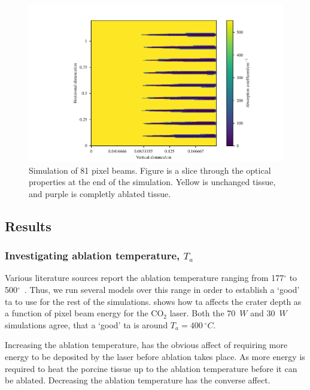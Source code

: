 \begin{figure}
	\centering
    \includegraphics[width=\columnwidth]{./ablation/images/slice.pdf}
    \caption{Simulation of 81 pixel beams. Figure is a slice through the optical properties at the end of the simulation. Yellow is unchanged tissue, and purple is completly ablated tissue.}\label{fig:sizecheck}
\end{figure}

\subsection{Results}

\subsubsection{Investigating ablation temperature, \texorpdfstring{$T_a$}{Ta}}

Various literature sources report the ablation temperature ranging from 177$^{\circ}$ to 500$^{\circ}$~\cite{gerstmann1994char,mckenzie1986three}. Thus, we run several models over this range in order to establish a `good' \gls{ta} to use for the rest of the simulations.  shows how \gls{ta} affects the crater depth as a function of pixel beam energy for the CO$_2$ laser. Both the 70~$W$ and 30~$W$ simulations agree, that a `good' \gls{ta} is around $T_a=400~^{\circ}C$.

Increasing the ablation temperature, has the obvious affect of requiring more energy to be deposited by the laser before ablation takes place. As more energy is required to heat the porcine tissue up to the ablation temperature before it can be ablated. Decreasing the ablation temperature has the converse affect.


